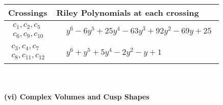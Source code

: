 \documentclass[1p]{elsarticle_modified}
\theoremstyle{definition}
\begin{document}
\begin{tabular}{m{50pt}|m{274pt}}
Crossings & \hspace{64pt}Riley Polynomials at each crossing \\
\hline $$\begin{aligned}c_{1},c_{2},c_{5}\\c_{6},c_{9},c_{10}\end{aligned}$$&$\begin{aligned}
&y^6-6 y^5+25 y^4-63 y^3+92 y^2-69 y+25
\end{aligned}$\\
\hline $$\begin{aligned}c_{3},c_{4},c_{7}\\c_{8},c_{11},c_{12}\end{aligned}$$&$\begin{aligned}
&y^6+y^5+5 y^4-2 y^2- y+1
\end{aligned}$\\
\hline
\end{tabular}\\~\\
\newpage\flushleft \textbf{(vi) Complex Volumes and Cusp Shapes}
\end{document}
